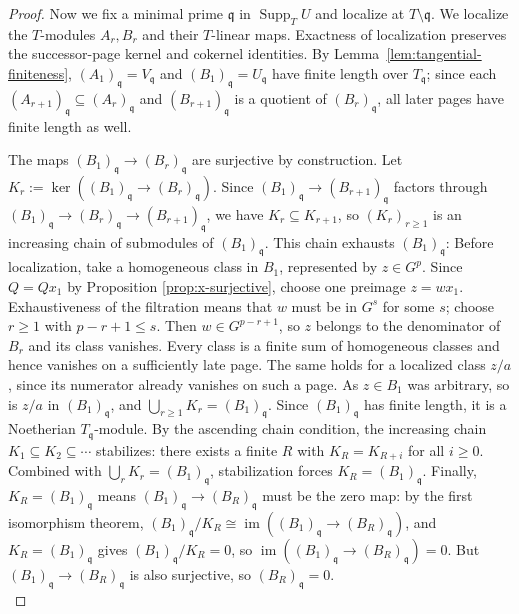 \documentclass[pdflatex,sn-mathphys-num]{sn-jnl}
\numberwithin{equation}{section}
\theoremstyle{thmstyleone}
\theoremstyle{thmstyletwo}
\begin{document}
\begin{proof}
Now we fix a minimal prime $\mathfrak q$ in $\operatorname{Supp}_TU$ and localize at
$T\setminus\mathfrak q$. We localize the $T$-modules
$A_r,B_r$ and their $T$-linear maps. Exactness of localization preserves the
successor-page kernel and cokernel identities. By
Lemma~\ref{lem:tangential-finiteness}, $(A_1)_{\mathfrak q}=V_{\mathfrak q}$ and
$(B_1)_{\mathfrak q}=U_{\mathfrak q}$ have finite length over $T_{\mathfrak q}$; since each
$(A_{r+1})_{\mathfrak q}\subseteq (A_r)_{\mathfrak q}$ and $(B_{r+1})_{\mathfrak q}$ is a quotient of $(B_r)_{\mathfrak q}$, all later pages
have finite length as well.


The maps $(B_1)_{\mathfrak q}\to (B_r)_{\mathfrak q}$ are surjective by construction.
Let $K_r:=\ker((B_1)_{\mathfrak q}\to (B_r)_{\mathfrak q})$. Since $(B_1)_{\mathfrak q}\to (B_{r+1})_{\mathfrak q}$ factors through $(B_1)_{\mathfrak q}\to (B_r)_{\mathfrak q}\to (B_{r+1})_{\mathfrak q}$, we have
$K_r\subseteq K_{r+1}$, so $(K_r)_{r\ge1}$ is an increasing chain of submodules of $(B_1)_{\mathfrak q}$.
This chain exhausts $(B_1)_{\mathfrak q}$: Before localization, take a homogeneous
class in $B_1$, represented by $z\in G^p$. Since $Q=Qx_1$ by Proposition \ref{prop:x-surjective}, choose one preimage
$z=wx_1$. Exhaustiveness of the filtration means that $w$ must be in $G^s$ for some $s$; choose $r\ge1$ with
$p-r+1\le s$. Then $w\in G^{p-r+1}$, so $z$ belongs to the denominator of
$B_r$ and its class vanishes. Every class is a finite sum of homogeneous
classes and hence vanishes on a sufficiently late page. The same holds for a
localized class $z/a$, since its numerator already vanishes on such a page.
As $z\in B_1$ was arbitrary, so is $z/a$ in $(B_1)_{\mathfrak q}$, and $\bigcup_{r\ge1}K_r=(B_1)_{\mathfrak q}$.
Since $(B_1)_{\mathfrak q}$ has finite length, it is a Noetherian $T_{\mathfrak q}$-module. By the ascending
chain condition, the increasing chain $K_1\subseteq K_2\subseteq\cdots$ stabilizes: there exists a finite $R$ with
$K_R=K_{R+i}$ for all $i\geq 0$. Combined with $\bigcup_rK_r=(B_1)_{\mathfrak q}$, stabilization forces $K_R=(B_1)_{\mathfrak q}$.
Finally, $K_R=(B_1)_{\mathfrak q}$ means $(B_1)_{\mathfrak q}\to (B_R)_{\mathfrak q}$ must be the zero map: by the first isomorphism theorem,
$(B_1)_{\mathfrak q}/K_R\cong\operatorname{im}((B_1)_{\mathfrak q}\to (B_R)_{\mathfrak q})$, and $K_R=(B_1)_{\mathfrak q}$ gives $(B_1)_{\mathfrak q}/K_R=0$, so
$\operatorname{im}((B_1)_{\mathfrak q}\to (B_R)_{\mathfrak q})=0$. But $(B_1)_{\mathfrak q}\to (B_R)_{\mathfrak q}$ is also surjective, so $(B_R)_{\mathfrak q}=0$.\\


\end{proof}
\end{document}
